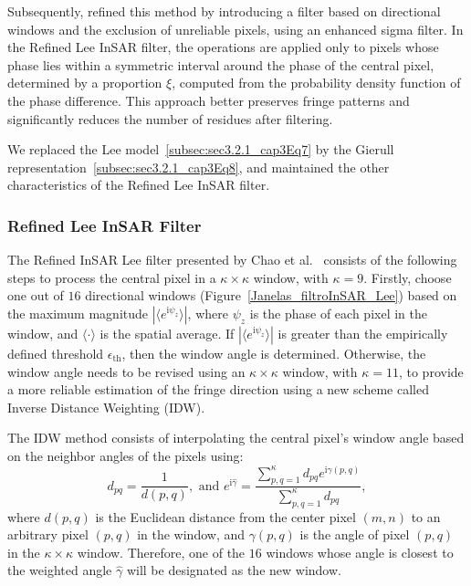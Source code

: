 \documentclass[remotesensing,article,submit,pdftex,moreauthors]{Definitions/mdpi}
\begin{document}
Subsequently, \citet{RefinedFilteringofInterferometricPhaseFromInSARData} refined this method by introducing a filter based on directional windows and the exclusion of unreliable pixels, using an enhanced sigma filter. 
In the Refined Lee InSAR filter, the operations are applied only to pixels whose phase lies within a symmetric interval around the phase of the central pixel, determined by a proportion $\xi$, computed from the probability density function of the phase difference. 
This approach better preserves fringe patterns and significantly reduces the number of residues after filtering.

We replaced the Lee model~\eqref{subsec:sec3.2.1_cap3Eq7} by the Gierull representation~\eqref{subsec:sec3.2.1_cap3Eq8}, and 
maintained the other characteristics of the Refined Lee InSAR filter. 

\subsubsection{Refined Lee InSAR Filter}\label{sec:refined}

The Refined InSAR Lee filter presented by Chao et al.~\cite{RefinedFilteringofInterferometricPhaseFromInSARData} 
consists of the following steps
to process the central pixel in a $\kappa\times \kappa$ window, with $\kappa=9$.
Firstly, choose one out of $16$ directional windows (Figure~\ref{Janelas_filtroInSAR_Lee}) based on the maximum magnitude $|\langle e^{\mathrm{i}\psi_z}\rangle|$, where $\psi_z$ is the phase of each pixel in the window, and $\langle \cdot \rangle$ is the spatial average. If $|\langle e^{\mathrm{i}\psi_z}\rangle|$ is greater than the empirically defined threshold $\epsilon_{\text{th}}$, then the window angle is determined. Otherwise, the window angle needs to be revised using an $\kappa\times \kappa$ window, with $\kappa= 11$, to provide a more reliable estimation of the fringe direction using a new scheme called Inverse Distance Weighting (IDW).

The IDW method consists of interpolating the central pixel's window angle based on the neighbor angles of the pixels using:
\begin{equation}\label{subsec:sec3.7.2_cap3Eq}
	d_{pq}=\dfrac{1}{d(p,q)},
	\text{ and }
	e^{\mathrm{i}\widehat{\gamma}}= \dfrac{\sum\limits_{p, q=1}^{\kappa} d_{pq} e^{\mathrm{i}\gamma(p, q)}}{\sum\limits_{p,q=1}^{\kappa}d_{pq}},
\end{equation}
where $d(p,q)$ is the Euclidean distance from the center pixel $(m, n)$ to an arbitrary pixel $(p,q)$ in the window, and $\gamma(p, q)$ is the angle of pixel $(p, q)$ in the $\kappa \times \kappa$ window. 
Therefore, one of the $16$ windows whose angle is closest to the weighted angle $\widehat{\gamma}$ will be designated as the new window.
\end{document}
